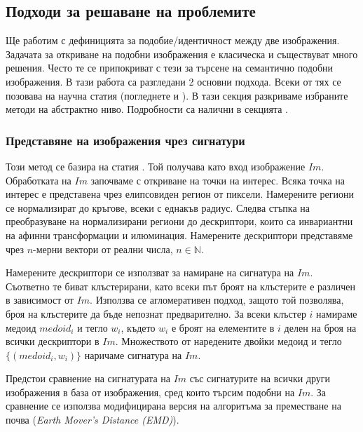\documentclass[a4paper,12pt]{article}
\begin{document}
\subsection{Подходи за решаване на проблемите}

Ще работим с дефиницията за подобие/идентичност между две изображения. Задачата за откриване на подобни изображения е класическа и съществуват много решения. Често те се припокриват с тези за търсене на семантично подобни изображения. В тази работа са разгледани 2 основни подхода. Всеки от тях се позовава на научна статия (погледнете \cite{spinimages} и \cite{sift}). В тази секция разкриваме избраните методи на абстрактно ниво. Подробности са налични в секцията \pageref{implementation}.

\subsubsection{Представяне на изображения чрез сигнатури}

Този метод се базира на статия \cite{spinimages}. Той получава като вход изображение $Im$. Обработката на $Im$ започваме с откриване на точки на интерес. Всяка точка на интерес е представена чрез елипсовиден регион от пиксели. Намерените региони се нормализират до кръгове, всеки с еднакъв радиус. Следва стъпка на преобразуване на нормализирани региони до дескриптори, които са инвариантни на афинни трансформации и илюминация. Намерените дескриптори представяме чрез $n$-мерни вектори от реални числа, $n \in \mathbb{N}$.

\bigbreak

Намерените дескриптори се използват за намиране на сигнатура на $Im$. Съответно те биват клъстерирани, като всеки път броят на клъстерите е различен в зависимост от $Im$. Използва се агломеративен подход, защото той позволява, броя на клъстерите да бъде непознат предварително. За всеки клъстер $i$ намираме медоид $medoid_i$ и тегло $w_i$, където $w_i$ е броят на елементите в $i$ делен на броя на всички дескриптори в $Im$. Множеството от наредените двойки медоид и тегло $\{(medoid_i, w_i)\}$ наричаме сигнатура на $Im$.

\bigbreak

Предстои сравнение на сигнатурата на $Im$ със сигнатурите на всички други изображения в база от изображения, сред които търсим подобни на $Im$. За сравнение се използва модифицирана версия на алгоритъма за преместване на почва (\textit{Earth Mover's Distance (EMD)}).
\end{document}
